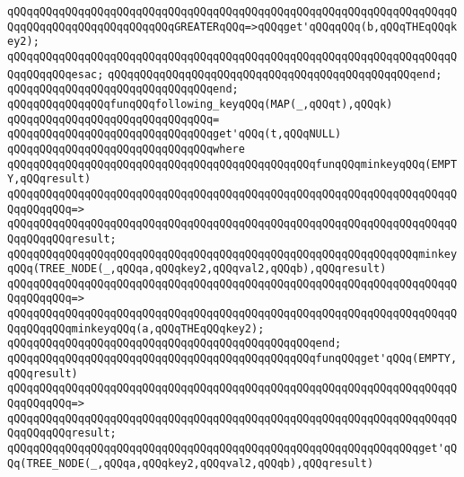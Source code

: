 \verb|qQQqqQQqqQQqqQQqqQQqqQQqqQQqqQQqqQQqqQQqqQQqqQQqqQQqqQQqqQQqqQQqqQQqqQQqqQQqqQQqqQQqqQQqqQQqqQQqGREATERqQQq=>qQQqget'qQQqqQQq(b,qQQqTHEqQQqkey2);|\newline
\verb|qQQqqQQqqQQqqQQqqQQqqQQqqQQqqQQqqQQqqQQqqQQqqQQqqQQqqQQqqQQqqQQqqQQqqQQqqQQqqQQqesac;|\newline
\verb|qQQqqQQqqQQqqQQqqQQqqQQqqQQqqQQqqQQqqQQqqQQqqQQqend;|\newline
\verb|qQQqqQQqqQQqqQQqqQQqqQQqqQQqqQQqend;|\newline
\verb|qQQqqQQqqQQqqQQqfunqQQqfollowing_keyqQQq(MAP(_,qQQqt),qQQqk)|\newline
\verb|qQQqqQQqqQQqqQQqqQQqqQQqqQQqqQQq=|\newline
\verb|qQQqqQQqqQQqqQQqqQQqqQQqqQQqqQQqget'qQQq(t,qQQqNULL)|\newline
\verb|qQQqqQQqqQQqqQQqqQQqqQQqqQQqqQQqwhere|\newline
\verb|qQQqqQQqqQQqqQQqqQQqqQQqqQQqqQQqqQQqqQQqqQQqqQQqfunqQQqminkeyqQQq(EMPTY,qQQqresult)|\newline
\verb|qQQqqQQqqQQqqQQqqQQqqQQqqQQqqQQqqQQqqQQqqQQqqQQqqQQqqQQqqQQqqQQqqQQqqQQqqQQqqQQq=>|\newline
\verb|qQQqqQQqqQQqqQQqqQQqqQQqqQQqqQQqqQQqqQQqqQQqqQQqqQQqqQQqqQQqqQQqqQQqqQQqqQQqqQQqresult;|\newline
\newline
\verb|qQQqqQQqqQQqqQQqqQQqqQQqqQQqqQQqqQQqqQQqqQQqqQQqqQQqqQQqqQQqqQQqminkeyqQQq(TREE_NODE(_,qQQqa,qQQqkey2,qQQqval2,qQQqb),qQQqresult)|\newline
\verb|qQQqqQQqqQQqqQQqqQQqqQQqqQQqqQQqqQQqqQQqqQQqqQQqqQQqqQQqqQQqqQQqqQQqqQQqqQQqqQQq=>|\newline
\verb|qQQqqQQqqQQqqQQqqQQqqQQqqQQqqQQqqQQqqQQqqQQqqQQqqQQqqQQqqQQqqQQqqQQqqQQqqQQqqQQqminkeyqQQq(a,qQQqTHEqQQqkey2);|\newline
\verb|qQQqqQQqqQQqqQQqqQQqqQQqqQQqqQQqqQQqqQQqqQQqqQQqend;|\newline
\newline
\verb|qQQqqQQqqQQqqQQqqQQqqQQqqQQqqQQqqQQqqQQqqQQqqQQqfunqQQqget'qQQq(EMPTY,qQQqresult)|\newline
\verb|qQQqqQQqqQQqqQQqqQQqqQQqqQQqqQQqqQQqqQQqqQQqqQQqqQQqqQQqqQQqqQQqqQQqqQQqqQQqqQQq=>|\newline
\verb|qQQqqQQqqQQqqQQqqQQqqQQqqQQqqQQqqQQqqQQqqQQqqQQqqQQqqQQqqQQqqQQqqQQqqQQqqQQqqQQqresult;|\newline
\newline
\verb|qQQqqQQqqQQqqQQqqQQqqQQqqQQqqQQqqQQqqQQqqQQqqQQqqQQqqQQqqQQqqQQqget'qQQq(TREE_NODE(_,qQQqa,qQQqkey2,qQQqval2,qQQqb),qQQqresult)|\newline
